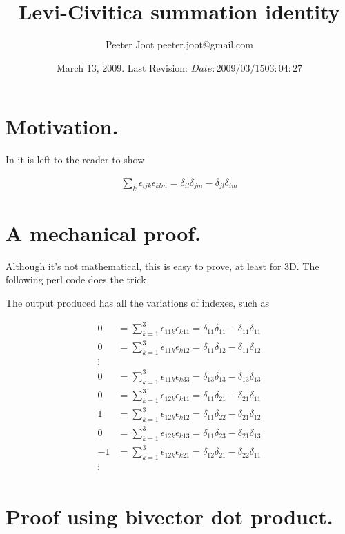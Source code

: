 \documentclass{article}
\title{ Levi-Civitica summation identity }
\author{Peeter Joot \quad peeter.joot@gmail.com }
\date{ March 13, 2009.  Last Revision: $Date: 2009/03/15 03:04:27 $ }
\begin{document}
\maketitle{}
\tableofcontents
\section{ Motivation. }

In \cite{byron1992mca} it is left to the reader to show 

\begin{align*}
\sum_k \epsilon_{ijk} \epsilon_{klm} = \delta_{il}\delta_{jm} - \delta_{jl}\delta_{im}
\end{align*}

\section{ A mechanical proof. }

Although it's not mathematical, this is easy to prove, at least for 3D.  The
following perl code does the trick



The output produced has all the variations of indexes, such as

\begin{align*}
0 &= \sum_{k=1}^{3} \epsilon_{11k} \epsilon_{k11} = \delta_{11}\delta_{11} - \delta_{11}\delta_{11} \\ 
0 &= \sum_{k=1}^{3} \epsilon_{11k} \epsilon_{k12} = \delta_{11}\delta_{12} - \delta_{11}\delta_{12} \\ 
\vdots \\
0 &= \sum_{k=1}^{3} \epsilon_{11k} \epsilon_{k33} = \delta_{13}\delta_{13} - \delta_{13}\delta_{13} \\ 
0 &= \sum_{k=1}^{3} \epsilon_{12k} \epsilon_{k11} = \delta_{11}\delta_{21} - \delta_{21}\delta_{11} \\ 
1 &= \sum_{k=1}^{3} \epsilon_{12k} \epsilon_{k12} = \delta_{11}\delta_{22} - \delta_{21}\delta_{12} \\ 
0 &= \sum_{k=1}^{3} \epsilon_{12k} \epsilon_{k13} = \delta_{11}\delta_{23} - \delta_{21}\delta_{13} \\ 
-1 &= \sum_{k=1}^{3} \epsilon_{12k} \epsilon_{k21} = \delta_{12}\delta_{21} - \delta_{22}\delta_{11} \\ 
\vdots \\
\end{align*}

\section{ Proof using bivector dot product. }
\end{document}
